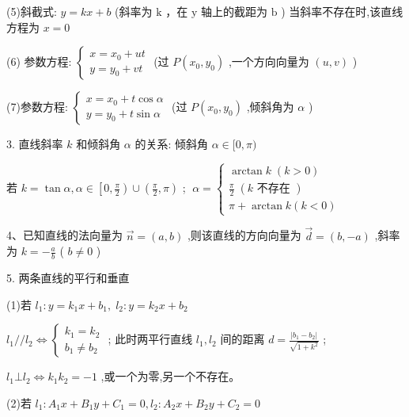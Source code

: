 \documentclass[10pt]{article}
\begin{document}
(5)斜截式: \(y = {kx} + b\) (斜率为 \(\mathrm{k}\) ，在 \(\mathrm{y}\) 轴上的截距为 \(\mathrm{b}\) ) 当斜率不存在时,该直线方程为 \(x = 0\)

(6) 参数方程: \(\left\{  \begin{array}{l} x = {x}_{0} + {ut} \\  y = {y}_{0} + {vt} \end{array}\right.\) (过 \(P\left( {{x}_{0},{y}_{0}}\right)\) ,一个方向向量为 \(\left( {u,v}\right)\) )

(7)参数方程: \(\left\{  \begin{array}{l} x = {x}_{0} + t\cos \alpha \\  y = {y}_{0} + t\sin \alpha  \end{array}\right.\) (过 \(P\left( {{x}_{0},{y}_{0}}\right)\) ,倾斜角为 \(\alpha\) )

3. 直线斜率 \(k\) 和倾斜角 \(\alpha\) 的关系: 倾斜角 \(\alpha  \in  \lbrack 0,\pi )\)

若 \(k = \tan \alpha ,\alpha  \in  \left\lbrack  {0,\frac{\pi }{2}}\right)  \cup  \left( {\frac{\pi }{2},\pi }\right)\) ; \(\;\alpha  = \left\{  \begin{array}{l} \arctan k\;\left( {k > 0}\right) \\  \frac{\pi }{2}\;\left( {k\text{ 不存在 }}\right) \\  \pi  + \arctan k\left( {k < 0}\right)  \end{array}\right.\)

4、已知直线的法向量为 \(\overrightarrow{n} = \left( {a,b}\right)\) ,则该直线的方向向量为 \(\overrightarrow{d} = \left( {b, - a}\right)\) ,斜率为 \(k =  - \frac{a}{b}\) ( \(b \neq  0\) )

5. 两条直线的平行和垂直

(1)若 \({l}_{1} : y = {k}_{1}x + {b}_{1},\;{l}_{2} : y = {k}_{2}x + {b}_{2}\)

\({l}_{1}//{l}_{2} \Leftrightarrow  \left\{  \begin{array}{l} {k}_{1} = {k}_{2} \\  {b}_{1} \neq  {b}_{2} \end{array}\right.\) ; 此时两平行直线 \({l}_{1},{l}_{2}\) 间的距离 \(d = \frac{\left| {b}_{1} - {b}_{2}\right| }{\sqrt{1 + {k}^{2}}}\) ;

\({l}_{1} \bot  {l}_{2} \Leftrightarrow  {k}_{1}{k}_{2} =  - 1\) ,或一个为零,另一个不存在。

(2)若 \({l}_{1} : {A}_{1}x + {B}_{1}y + {C}_{1} = 0,{l}_{2} : {A}_{2}x + {B}_{2}y + {C}_{2} = 0\)
\end{document}
